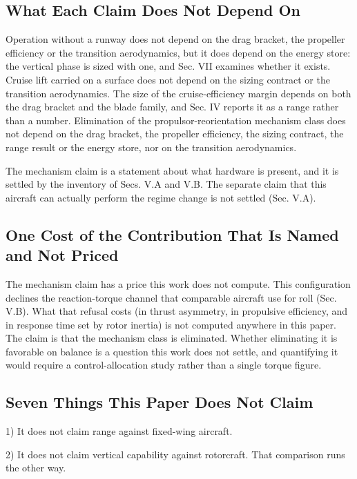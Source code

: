 \documentclass[journal]{new-aiaa}
\begin{document}
\subsection{What Each Claim Does Not Depend On}

Operation without a runway does not depend on the drag bracket, the propeller efficiency or the transition aerodynamics, but it does depend on the energy store: the vertical phase is sized with one, and Sec. VII examines whether it exists. Cruise lift carried on a surface does not depend on the sizing contract or the transition aerodynamics. The size of the cruise-efficiency margin depends on both the drag bracket and the blade family, and Sec. IV reports it as a range rather than a number. Elimination of the propulsor-reorientation mechanism class does not depend on the drag bracket, the propeller efficiency, the sizing contract, the range result or the energy store, nor on the transition aerodynamics.

The mechanism claim is a statement about what hardware is present, and it is settled by the inventory of Secs. V.A and V.B. The separate claim that this aircraft can actually perform the regime change is not settled (Sec. V.A).

\subsection{One Cost of the Contribution That Is Named and Not Priced}

The mechanism claim has a price this work does not compute. This configuration declines the reaction-torque channel that comparable aircraft use for roll (Sec. V.B). What that refusal costs (in thrust asymmetry, in propulsive efficiency, and in response time set by rotor inertia) is not computed anywhere in this paper. The claim is that the mechanism class is eliminated. Whether eliminating it is favorable on balance is a question this work does not settle, and quantifying it would require a control-allocation study rather than a single torque figure.

\subsection{Seven Things This Paper Does Not Claim}

1) It does not claim range against fixed-wing aircraft.

2) It does not claim vertical capability against rotorcraft. That comparison runs the other way.
\end{document}
